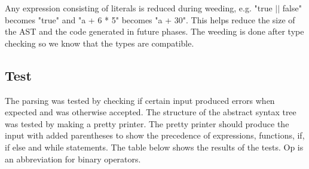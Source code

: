 \documentclass{article}
\begin{document}
Any expression consisting of literals is reduced during weeding, e.g. "true $||$ false" becomes "true" and "a + 6 * 5" becomes "a + 30". This helps reduce the size of the AST and the code generated in future phases. The weeding is done after type checking so we know that the types are compatible. 

\subsection{Test}


The parsing was tested by checking if certain input produced errors when expected and was otherwise accepted. The structure of the abstract syntax tree was tested by making a pretty printer. The pretty printer should produce the input with added parentheses to show the precedence of expressions, functions, if, if else and while statements. 
\newline
\newline
The table below shows the results of the tests. Op is an abbreviation for binary operators.\\


\end{document}
